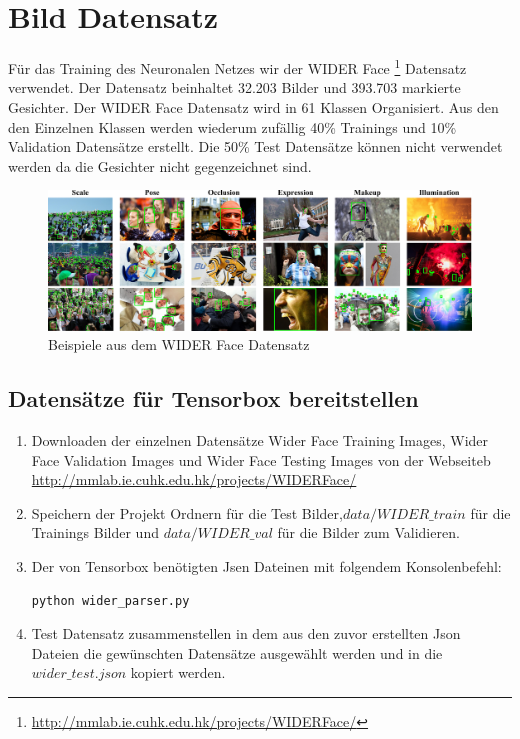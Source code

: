 \section{Bild Datensatz} \label{dataset}
Für das Training des Neuronalen Netzes wir der WIDER Face \footnote{\url{http://mmlab.ie.cuhk.edu.hk/projects/WIDERFace/}} Datensatz verwendet. Der Datensatz beinhaltet	32.203 Bilder und 393.703 markierte Gesichter. Der WIDER Face Datensatz wird in 61 Klassen Organisiert. Aus den den Einzelnen Klassen werden wiederum zufällig 40\% Trainings und 10\%  Validation Datensätze erstellt. Die 50\% Test Datensätze können nicht verwendet werden da die Gesichter nicht gegenzeichnet sind.
\begin{figure}
    \includegraphics[width=1.0\textwidth]{bilder/wider-exampl}
    \caption{Beispiele aus dem WIDER Face Datensatz}
\end{figure} 
\subsection{Datensätze für Tensorbox bereitstellen}
\begin{enumerate}
\item Downloaden der einzelnen Datensätze Wider Face Training Images, Wider Face Validation Images und Wider Face Testing Images von der Webseiteb \url{http://mmlab.ie.cuhk.edu.hk/projects/WIDERFace/}
\item Speichern der Projekt Ordnern für die Test Bilder,$data/WIDER\_train$ für die Trainings Bilder und $data/WIDER\_val$ für die Bilder zum Validieren.
\item Der von Tensorbox benötigten Jsen Dateinen mit folgendem Konsolenbefehl:\begin{lstlisting}[language=bash] 
python wider_parser.py
\end{lstlisting}
\item Test Datensatz zusammenstellen in dem aus den zuvor erstellten Json Dateien die gewünschten Datensätze ausgewählt werden und in die $wider\_test.json$ kopiert werden.
\end{enumerate}

